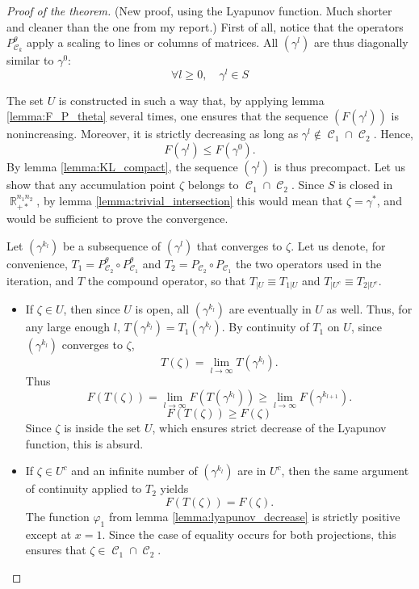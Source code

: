 \documentclass{article} %
\DeclareMathOperator{\IR}{\mathbb{R}}
\DeclareMathOperator{\Ccal}{\mathcal{C}}
\theoremstyle{plain}
\theoremstyle{definition}
\theoremstyle{remark}
\begin{document}
\begin{proof}[Proof of the theorem]
	(New proof, using the Lyapunov function. Much shorter and cleaner than the one from my report.)
	First of all, notice that the operators $P_{\Ccal_k}^\theta$ apply a scaling to lines or columns of matrices. All $(\gamma^l)$ are thus diagonally similar to $\gamma^0$:
	\[
	\forall l\ge0,\quad \gamma^l \in S
	\]
	
	The set $U$ is constructed in such a way that, by applying lemma \ref{lemma:F_P_theta} several times, one ensures that the sequence $(F(\gamma^l))$ is nonincreasing. Moreover, it is strictly decreasing as long as $\gamma^l \not \in \Ccal_1 \cap \Ccal_2$.
	Hence, 
	\[
	F(\gamma^l) \le F(\gamma^0).
	\]
	By lemma \ref{lemma:KL_compact}, the sequence $(\gamma^l)$ is thus precompact. Let us show that any accumulation point $\zeta$ belongs to $\Ccal_1 \cap \Ccal_2$. Since $S$ is closed in $\IR_{+*}^{n_1 n_2}$, by lemma \ref{lemma:trivial_intersection} this would mean that $\zeta = \gamma^*$, and would be sufficient to prove the convergence.
	
	Let $(\gamma^{k_l})$ be a subsequence of $(\gamma^l)$ that converges to $\zeta$.
	Let us denote, for convenience, $T_1 = P_{\Ccal_2}^\theta \circ P_{\Ccal_1}^\theta$ and $T_2 = P_{\Ccal_2} \circ P_{\Ccal_1}$ the two operators used in the iteration, and $T$ the compound operator, so that $T_{|U} \equiv T_{1|U}$ and $T_{|U^c} \equiv T_{2|U^c}$.
	\begin{itemize}
		\item If $\zeta \in U$, then since $U$ is open, all $(\gamma^{k_l})$ are eventually in $U$ as well.
		Thus, for any large enough $l$, $ T(\gamma^{k_l}) = T_1(\gamma^{k_l}) $. By continuity of $T_1$ on $U$, since $(\gamma^{k_l})$ converges to $\zeta$, 
		\[T(\zeta) = \lim_{l\rightarrow \infty} T(\gamma^{k_l}).\] Thus
		 \[F(T(\zeta)) = \lim_{l \rightarrow \infty} F(T(\gamma^{k_l})) \ge \lim_{l\rightarrow \infty} F(\gamma^{k_{l+1}}) .\]
		 \[
		 F(T(\zeta)) \ge F(\zeta)
		 \] Since $\zeta$ is inside the set $U$, which ensures strict decrease of the Lyapunov function, this is absurd.
		 \item If $\zeta \in U^c$ and an infinite number of $(\gamma^{k_l})$ are in $U^c$, then the same argument of continuity applied to $T_2$ yields
		 \[
		 F(T(\zeta)) = F(\zeta).
		 \]
		 The function $\varphi_1$ from lemma \ref{lemma:lyapunov_decrease} is strictly positive except at $x=1$. Since the case of equality occurs for both projections, this ensures that $\zeta \in \Ccal_1 \cap \Ccal_2$.
		 

\end{itemize}
\end{proof}
\end{document}
